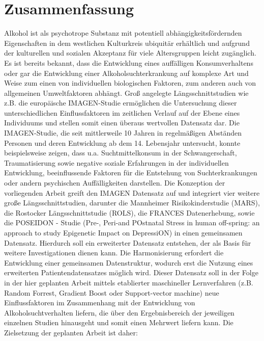 \chapter*{Zusammenfassung}
\vspace*{-2.5em}
Alkohol ist als psychotrope Substanz mit potentiell abhängigkeitsfördernden Eigenschaften in dem westlichen Kulturkreis ubiquitär erhältlich und aufgrund der kulturellen und sozialen Akzeptanz für viele Altersgruppen leicht zugänglich. Es ist bereits bekannt, dass die Entwicklung eines auffälligen Konsumverhaltens oder gar die Entwicklung einer Alkoholsuchterkrankung auf komplexe Art und Weise zum einen von individuellen biologischen Faktoren, zum anderen auch von allgemeinen Umweltfaktoren abhängt. Groß angelegte Längsschnittstudien wie z.B. die europäische IMAGEN-Studie ermöglichen die Untersuchung dieser unterschiedlichen Einflussfaktoren im zeitlichen Verlauf auf der Ebene eines Individuums und stellen somit einen überaus wertvollen Datensatz dar. Die IMAGEN-Studie, die seit mittlerweile 10 Jahren in regelmäßigen Abständen Personen und deren Entwicklung ab dem 14. Lebensjahr untersucht, konnte beispielsweise zeigen, dass u.a. Suchtmittelkonsum in der Schwangerschaft, Traumatisierung sowie negative soziale Erfahrungen in der individuellen Entwicklung, beeinflussende Faktoren für die Entstehung von Suchterkrankungen oder andern psychischen Auffälligkeiten darstellen.
Die Konzeption der vorliegenden Arbeit greift den IMAGEN Datensatz auf und integriert vier weitere große Längsschnittstudien, darunter die Mannheimer Risikokinderstudie (MARS), die Rostocker Längsschnittstudie (ROLS), die FRANCES Datenerhebung, sowie die POSEIDON - Studie (Pre-, Peri-and POstnatal Stress in human off-spring: an approach to study Epigenetic Impact on DepressiON) in einen gemeinsamen Datensatz. Hierdurch soll ein erweiterter Datensatz entstehen, der als Basis für weitere Investigationen dienen kann. Die Harmonisierung erfordert die Entwicklung einer gemeinsamen Datenstruktur, wodurch erst die Nutzung eines erweiterten Patientendatensatzes möglich wird. Dieser Datensatz soll in der Folge in der hier geplanten Arbeit mittels etablierter maschineller Lernverfahren (z.B. Random Forrest, Gradient Boost oder Support-vector machine) neue Einflussfaktoren im Zusammenhang mit der Entwicklung von Alkoholsuchtverhalten liefern, die über den Ergebnisbereich der jeweiligen einzelnen Studien hinausgeht und somit einen Mehrwert liefern kann.
Die Zielsetzung der geplanten Arbeit ist daher:
